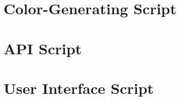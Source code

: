\renewcommand{\appendixname}{Appendix}

\begin{appendices}
\chapter{Color-Generating Script}
\chapter{API Script}
\chapter{User Interface Script}
\end{appendices}